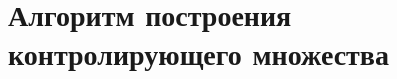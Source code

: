 \documentclass[discrete.tex]{subfiles}
\begin{document}
\section{Алгоритм построения контролирующего множества}
\end{document}
